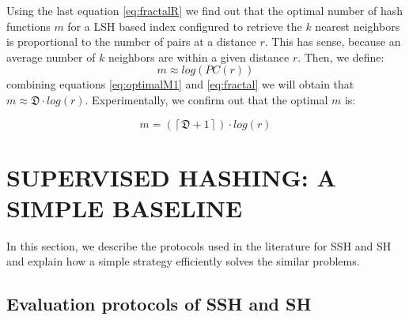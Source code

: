 \documentclass[conference]{IEEEtran}
\begin{document}
 Using the last equation \ref{eq:fractalR} we find out that the optimal number of hash functions $m$  for a \acf{LSH} based index configured to retrieve the $k$ nearest neighbors is proportional to the number of pairs at a distance $r$. This has sense, because an average number of $k$ neighbors  are within a given distance $r$.  Then, we define:
\begin{equation}\label{eq:optimalM1}
   m \approx log (PC(r)) 
\end{equation}
 combining  equations \ref{eq:optimalM1} and \ref{eq:fractal} we will obtain that $m \approx \mathfrak{D} \cdot log (r)  $. Experimentally, we confirm out that the optimal  $m$ is:

 \begin{equation}\label{eq:fractalm}
    m = (\left\lceil \mathfrak{D} + 1 \right\rceil  ) \cdot  log (r)
 \end{equation}

 








\section{SUPERVISED HASHING: A SIMPLE BASELINE}


In this section, we describe the protocols used in the literature for SSH and SH and explain how a simple strategy efficiently solves the similar problems.

\subsection{Evaluation protocols of SSH and SH}
\end{document}
